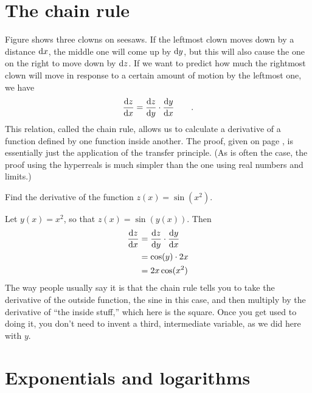 
\pagebreak[4]\section{The chain rule}\label{sec:chain-rule}

Figure  shows three clowns on seesaws. If the leftmost clown moves down by a distance $\textup{d} x$,
the middle one will come up by $\textup{d} y$, but this will also cause the one on the right to move down by $\textup{d} z$.
If we want to predict how much the rightmost clown will move in response to a certain amount of motion by the
leftmost one, we have
\begin{equation*}
  \frac{\textup{d} z}{\textup{d} x} =   \frac{\textup{d} z}{\textup{d} y}  \cdot \frac{\textup{d} y}{\textup{d} x} \qquad .
\end{equation*}
This relation, called the chain rule, allows us to calculate a derivative of a function defined by one function
inside another. The proof, given on page \pageref{detour:chain-rule}, is essentially just the application of the transfer principle. (As is often the case,
the proof using the hyperreals is much simpler than the one using real numbers and limits.)

\begin{eg}
\egquestion Find the derivative of the function $z(x)=\sin(x^2)$.

\eganswer Let $y(x)=x^2$, so that $z(x)=\sin(y(x))$. Then
\begin{align*}
  \frac{\textup{d} z}{\textup{d} x} &= \frac{\textup{d} z}{\textup{d} y} \cdot \frac{\textup{d} y}{\textup{d} x} \\
                        &= \cos(y) \cdot 2x \\
                        &= 2x \cos(x^2)
\end{align*}
The way people usually say it is that the chain rule tells you to take the derivative of
the outside function, the sine in this case, and then multiply by the derivative of
``the inside stuff,'' which here is the square. Once you get used to doing it, you don't
need to invent a third, intermediate variable, as we did here with $y$.
\end{eg}

\section{Exponentials and logarithms}

